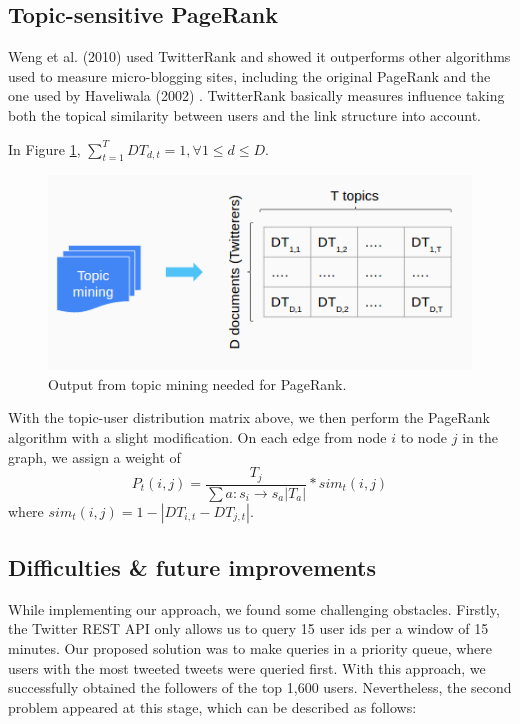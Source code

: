 \documentclass[11pt]{article}
\begin{document}
\subsection{Topic-sensitive PageRank}
Weng et al. (2010) used  TwitterRank and showed it outperforms other algorithms used to measure micro-blogging sites, including the original PageRank and the one used by Haveliwala (2002) \cite{haveliwala_2002}. TwitterRank basically measures influence taking both the topical similarity between users and the link structure into account.

In Figure \ref{fig:topic_2_pagerank}, $\sum_{t=1}^{T}{DT_{d,t}} = 1, \forall 1\le d\le D$.

\begin{figure}[H]
	\centering
	\includegraphics[scale=0.7]{topic_2_pagerank}
	\caption{Output from topic mining needed for PageRank.}
	\label{fig:topic_2_pagerank}
\end{figure}

With the topic-user distribution matrix above, we then perform the PageRank algorithm with a slight modification. On each edge from node $i$ to node $j$ in the graph, we assign a weight of
\[P_t(i,j)=\frac{T_j}{\sum{a:s_i\to s_a|T_a|}}*sim_t(i,j)\]
where $sim_t(i,j)=1-|DT_{i,t}-DT_{j,t}|$.

\subsection{Difficulties \& future improvements}

While implementing our approach, we found some challenging obstacles. Firstly, the Twitter REST API only allows us to query 15 user ids per a window of 15 minutes. Our proposed solution was to make queries in a priority queue, where users with the most tweeted tweets were queried first. With this approach, we successfully obtained the followers of the top 1,600 users. Nevertheless, the second problem appeared at this stage, which can be described as follows:
\end{document}
